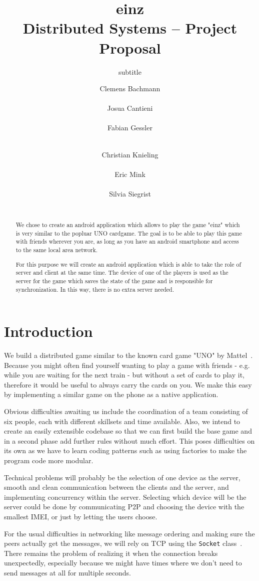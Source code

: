 \documentclass{report}
\title{einz\\
\normalsize{Distributed Systems -- Project Proposal}}
\subtitle{subtitle}
\author{
\alignauthor
\normalsize{Clemens Bachmann}\\
	\affaddr{\normalsize{13-932-488}}\\
	\email{\normalsize{baclemen@student.ethz.ch}}
%
\alignauthor
\normalsize{Josua Cantieni}\\
	\affaddr{\normalsize{15-919-038}}\\
	\email{\normalsize{josuac@student.ethz.ch}}
%
\alignauthor
\normalsize{Fabian Gessler}\\
	\affaddr{\normalsize{15-939-341}}\\
	\email{\normalsize{fgessler@student.ethz.ch}}
\and
\alignauthor
\normalsize{Christian Knieling}\\
	\affaddr{\normalsize{ 14-923-809}}\\
	\email{\normalsize{knielinc@student.ethz.ch}}
%
\alignauthor
\normalsize{Eric Mink}\\
	\affaddr{\normalsize{15-917-057}}\\
	\email{\normalsize{minker@student.ethz.ch}}
%
\alignauthor
\normalsize{Silvia Siegrist}\\
	\affaddr{\normalsize{15-935-893}}\\
	\email{\normalsize{sisilvia@student.ethz.ch}}
}
\begin{document}
\maketitle

\begin{abstract}
We chose to create an android application which allows to play the game "einz" which is very similar to the popluar UNO cardgame. The goal is to be able to play this game with friends wherever you are, as long as you have an android smartphone and access to the same local area network.

For this purpose we will create an android application which is able to take the role of server and client at the same time. The device of one of the players is used as the server for the game which saves the state of the game and is responsible for synchronization. In this way, there is no extra server needed.
\end{abstract}

\section{Introduction}
We build a distributed game similar to the known card game "UNO" by Mattel~\cite{unoshop}. Because you might often find yourself wanting to play a game with friends - e.g. while you are waiting for the next train - but without a set of cards to play it, therefore it would be useful to always carry the cards on you. We make this easy by implementing a similar game on the phone as a native application.

Obvious difficulties awaiting us include the coordination of a team consisting of six people, each with different skillsets and time available.
Also, we intend to create an easily extensible codebase so that we can first build the base game and in a second phase add further rules without much effort. This poses difficulties on its own as we have to learn coding patterns such as using factories to make the program code more modular.

Technical problems will probably be the selection of one device as the server, smooth and clean communication between the clients and the server, and implementing concurrency within the server. Selecting which device will be the server could be done by communicating P2P and choosing the device with the smallest IMEI, or just by letting the users choose.

For the usual difficulties in networking like message ordering and making sure the peers actually get the messages, we will rely on TCP using the \verb|Socket| class~\cite{socketdoc}. There remains the problem of realizing it when the connection breaks unexpectedly, especially because we might have times where we don't need to send messages at all for multiple seconds.
\end{document}
